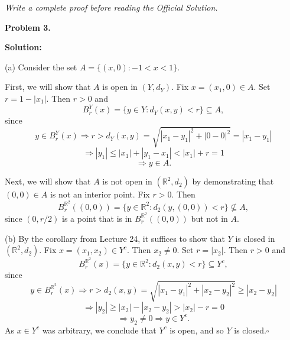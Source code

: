 \documentclass[12pt]{article}
\newcommand{\writespace}[1]{\vspace{#1}}
\begin{document}
\newpage

\begin{tcolorbox}[
  enhanced, breakable,
  colback  = pass5gray,
  colframe = black!38,
  fonttitle = \bfseries,
  title = {Pass 5 \enspace\textbf{--}\enspace Full Proof Attempt}
]
\small\itshape Write a complete proof before reading the Official Solution.\par
\normalfont\normalsize
\writespace{19cm}
\end{tcolorbox}

\newpage

\begin{tcolorbox}[
  enhanced, breakable,
  colback  = solgreen,
  colframe = green!45!black,
  fonttitle = \bfseries,
  title = {\textsc{Official Solution}\hfill Homework 9 -- Solutions}
]
\textbf{Problem 3.}

\medskip\textbf{Solution:}

\medskip
(a) Consider the set $A = \{(x, 0) : -1 < x < 1\}$.

\medskip
First, we will show that $A$ is open in $(Y, d_Y)$. Fix $x = (x_1, 0) \in A$. Set
$r = 1-|x_1|$. Then $r > 0$ and
\[
  B_r^Y(x) = \{y \in Y : d_Y(x, y) < r\} \subseteq A,
\]
since
\[
  y \in B_r^Y(x) \Longrightarrow r > d_Y(x, y) = \sqrt{|x_1-y_1|^2 + |0-0|^2} = |x_1-y_1|
\]
\[
  \Longrightarrow |y_1| \le |x_1| + |y_1-x_1| < |x_1| + r = 1
\]
\[
  \Longrightarrow y \in A.
\]

\medskip
Next, we will show that $A$ is not open in $(\mathbb{R}^2, d_2)$ by demonstrating that $(0, 0) \in A$ is not
an interior point. Fix $r > 0$. Then
\[
  B_r^{\mathbb{R}^2}((0, 0)) = \{y \in \mathbb{R}^2 : d_2(y, (0, 0)) < r\} \not\subseteq A,
\]
since $(0, r/2)$ is a point that is in $B_r^{\mathbb{R}^2}((0, 0))$ but not in $A$.

\medskip
(b) By the corollary from Lecture 24, it suffices to show that $Y$ is closed in $(\mathbb{R}^2, d_2)$.
Fix $x = (x_1, x_2) \in Y^c$. Then $x_2 \ne 0$. Set $r = |x_2|$. Then $r > 0$ and
\[
  B_r^{\mathbb{R}^2}(x) = \{y \in \mathbb{R}^2 : d_2(x, y) < r\} \subseteq Y^c,
\]
since
\[
  y \in B_r^{\mathbb{R}^2}(x) \Longrightarrow r > d_2(x, y) = \sqrt{|x_1-y_1|^2 + |x_2-y_2|^2} \ge |x_2-y_2|
\]
\[
  \Longrightarrow |y_2| \ge |x_2| - |x_2-y_2| > |x_2| - r = 0
\]
\[
  \Longrightarrow y_2 \ne 0 \Longrightarrow y \in Y^c.
\]
As $x \in Y^c$ was arbitrary, we conclude that $Y^c$ is open, and so $Y$ is closed.\hfill$\square$
\end{tcolorbox}

\bigskip
\end{document}
